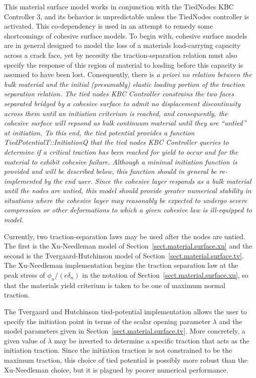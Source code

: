 This material surface model works in conjunction with the TiedNodes 
KBC Controller 3, and
its behavior is unpredictable unless the TiedNodes controller
is activated. This co-dependency is used in an attempt to
remedy some shortcomings of cohesive surface models. To begin with,
cohesive surface models are in general designed to model the loss of a 
materials load-carrying capacity across a crack face, yet by necesity
the traction-separation relation must also specify the response of this
region of material to loading before this capacity is assumed to have
been lost. Consequently, there is \it a priori \rm no relation between
the bulk material and the initial (presumably) elastic loading portion
of the traction separation relation. The tied nodes KBC Controller constrains
the two faces separated bridged by a cohesive surface to admit no
displacement discontinuity across them until an initiation criterium is
reached, and consequently, the cohesive surface will repsond as bulk
continuum material until they are ``untied'' at initiation. To this end,
the tied potential provides a function 
TiedPotentialT::InitiationQ that the tied nodes KBC Controller queries
to determine if a critical traction has been reached for yield to occur
and for the material to exhibit cohesive failure. Although a minimal
initiation function is provided and will be described below, this 
function should in general be re-implemented by the end user. Since
the cohesive layer responds as a bulk material until the nodes are untied,
this model should provide greater numerical stability in situations where
the cohesive layer may reasonably be expected to undergo severe compression
or other deformations to which a given cohesive law is ill-equipped to
model. 

Currently, two traction-separation laws may be used after the nodes
are untied. The first is the Xu-Needleman model of 
Section~\ref{sect.material.surface.xu} and the second is the 
Tvergaard-Hutchinson model of Section~\ref{sect.material.surface.tv}. The
Xu-Needleman implementation begins the traction separation law at the peak
stress of $\phi_n/(e \delta_n)$ in the notation of 
Section~\ref{sect.material.surface.xu}, so that the materials yield
criterium is taken to be one of maximum normal traction. 

The Tvergaard and Hutchinson tied-potential implementation allows
the user to specify the initiation point in terms of the scalar 
opening parameter $\lambda$ and the model parameters given in
Section~\ref{sect.material.surface.tv}. More concretely, a given
value of $\lambda$ may be inverted to determine a specific traction
that acts as the initiation traction. Since the initiation traction is
not constrained to be the maximum traction, this choice of tied potential
is possibly more robust than the Xu-Needleman choice, but it is 
plagued by poorer numerical performance. 

